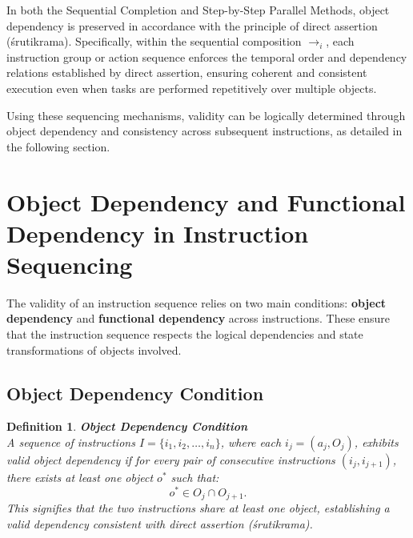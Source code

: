 \documentclass[a4paper,11pt]{lmcs}
\newtheorem{definition}{Definition}%
\begin{document}
In both the Sequential Completion and Step-by-Step Parallel Methods, object dependency is preserved in accordance with the principle of direct assertion (śrutikrama). Specifically, within the sequential composition $\rightarrow_i$, each instruction group or action sequence enforces the temporal order and dependency relations established by direct assertion, ensuring coherent and consistent execution even when tasks are performed repetitively over multiple objects.

Using these sequencing mechanisms, validity can be logically determined through object dependency and consistency across subsequent instructions, as detailed in the following section.
\section{Object Dependency and Functional Dependency in Instruction Sequencing}
\label{sec:dependency}

The validity of an instruction sequence relies on two main conditions: \textbf{object dependency} and \textbf{functional dependency} across instructions. These ensure that the instruction sequence respects the logical dependencies and state transformations of objects involved.

\subsection{Object Dependency Condition}
\begin{definition}
\textbf{Object Dependency Condition} \\
A sequence of instructions \( I = \{i_1, i_2, \ldots, i_n\} \), where each \( i_j = (a_j, O_j) \), exhibits valid object dependency if for every pair of consecutive instructions \( (i_j, i_{j+1}) \), there exists at least one object \( o^* \) such that:
\[
o^* \in O_j \cap O_{j+1}.
\]
This signifies that the two instructions share at least one object, establishing a valid dependency consistent with direct assertion (śrutikrama).
\end{definition}
\end{document}
